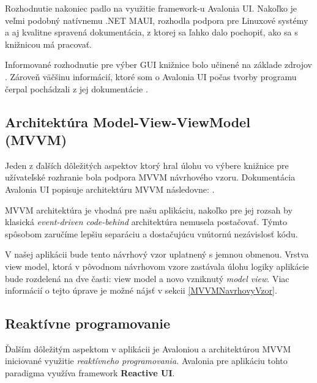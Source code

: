Rozhodnutie nakoniec padlo na využitie framework-u Avalonia UI. Nakoľko je veľmi podobný natívnemu .NET MAUI, rozhodla podpora pre Linuxové systémy a aj kvalitne spravená dokumentácia, z ktorej sa ľahko dalo pochopiť, ako sa s knižnicou má pracovať. 

Informované rozhodnutie pre výber GUI knižnice bolo učinené na základe zdrojov \cite{WpfGuide,WhatIsMAUI,AvaloniaMauiComparison}. Zároveň väčšinu informácií, ktoré som o Avalonia UI počas tvorby programu čerpal pochádzali z jej dokumentácie \cite{AvaloniaDokumentacia}.

\subsection{Architektúra Model-View-ViewModel (MVVM)}\label{ArchitekturaMVVM}

Jeden z ďalších dôležitých aspektov ktorý hral úlohu vo výbere knižnice pre užívateľské rozhranie bola podpora MVVM návrhového vzoru. Dokumentácia Avalonia UI popisuje architektúru MVVM následovne: \cite{MVVMDefByAvalonia}.

MVVM architektúra je vhodná pre našu aplikáciu, nakoľko pre jej rozsah by klasická \textit{event-driven code-behind} architektúra nemusela postačovať. Týmto spôsobom zaručíme lepšiu separáciu a dostačujúcu vnútornú nezávislosť kódu.    

V našej aplikácii bude tento návrhový vzor uplatnený s jemnou obmenou. Vrstva view model, ktorá v pôvodnom návrhovom vzore zastávala úlohu logiky aplikácie bude rozdelená na dve časti: view model a novo vzniknutý \textit{model view}. Viac informácií o tejto úprave je možné nájsť v sekcii \ref{MVVMNavrhovyVzor}. 

\subsection{Reaktívne programovanie}

Ďalším dôležitým aspektom v aplikácii je Avaloniou a architektúrou MVVM iniciované využitie \textit{reaktívneho programovania.} Avalonia pre aplikáciu tohto paradigma využíva framework \textbf{Reactive UI}. 


